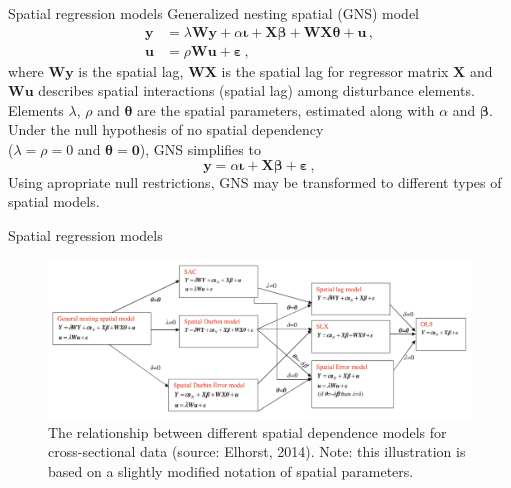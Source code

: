 \documentclass{beamer}
\begin{document}
\begin{frame}{Spatial regression models}
Generalized nesting spatial (GNS) model 
\begin{equation*}
\begin{aligned}
  \bm{y} &= \lambda \bm{W\!y} + \alpha \bm{\iota} + \bm{X \beta} + \bm{W\!X\theta} + \bm{u} \,, \\
  \bm{u} &= \rho \bm{W\!u} + \bm{\varepsilon} \,,
\end{aligned}
\end{equation*}
where $\bm{W\!y}$ is the spatial lag, $\bm{W\!X}$ is the spatial lag for regressor matrix $\bm{X}$ and $\bm{W\!u}$ describes spatial interactions (spatial lag) among disturbance elements. Elements $\lambda$, $\rho$ and $\bm{\theta}$ are the spatial parameters, estimated along with $\alpha$ and $\bm{\beta}$.\\ \bigskip
Under the null hypothesis of no spatial dependency \\($\lambda = \rho =0$  and $\bm{\theta}=\bm{0}$), GNS simplifies to 
\begin{equation*}
  \bm{y} = 
  \alpha \bm{\iota} + \bm{X \beta} + \bm{\varepsilon} \,,
\end{equation*}
Using apropriate null restrictions, GNS may be transformed to different types of spatial models.
\end{frame}
\begin{frame}{Spatial regression models}
\begin{figure}
	\includegraphics[width=1\textwidth]{IMG/sp_reg.PNG}
	\caption{The relationship between different spatial dependence models for cross-sectional data (source: Elhorst, 2014). Note: this illustration is based on a slightly modified notation of spatial parameters.}
\end{figure}
\end{frame}
\end{document}
